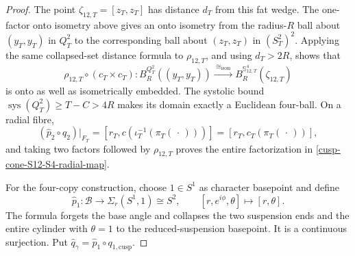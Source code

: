 \begin{proof}
The point \(\zeta_{12,T}=[z_T,z_T]\) has distance \(d_T\) from this fat
wedge.  The one-factor onto isometry above gives an onto isometry from the
radius-\(R\) ball about \((y_T,y_T)\) in \(Q_T^2\) to the corresponding
ball about \((z_T,z_T)\) in \((S_T^2)^2\).  Applying the same collapsed-set
distance formula to \(\rho_{12,T}\), and using \(d_T>2R\), shows that
\begin{equation}
 \rho_{12,T}\circ(c_T\times c_T):
 B_R^{Q_T^2}((y_T,y_T))
 \xrightarrow{\ \cong_{\mathrm{isom}}\ }
 B_R^{\mathbb S_{12,T}^4}(\zeta_{12,T})
 \label{cusp-cone-S12-onto-exact-ball}
\end{equation}
is onto as well as isometrically embedded.  The systolic bound
\(\operatorname{sys}(Q_T^2)\geq T-C>4R\) makes its domain exactly a
Euclidean four-ball.  On a radial fibre,
\[
 (\widehat p_2\circ q_2)|_{F_T}
 =[r_T,c(\iota_T^{-1}(\pi_T(\,\cdot\,)))]
 =[r_T,c_T(\pi_T(\,\cdot\,))],
\]
and taking two factors followed by \(\rho_{12,T}\) proves the entire
factorization in \cref{cusp-cone-S12-S4-radial-map}.

For the four-copy construction, choose \(1\in S^1\) as character basepoint
and define
\[
 \widehat p_1:\mathcal B\longrightarrow\Sigma_r(S^1,1)\cong S^2,
 \qquad
 [r,e^{i\phi},\theta]\longmapsto[r,\theta].
\]
The formula forgets the base angle and collapses the two suspension ends
and the entire cylinder with \(\theta=1\) to the reduced-suspension
basepoint.  It is a continuous surjection.  Put
\(\widehat q_\gamma=\widehat p_1\circ q_{1,\mathrm{cusp}}\).


\end{proof}

